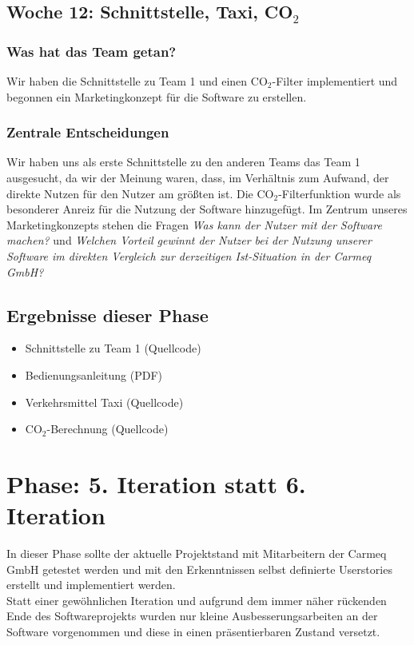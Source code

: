 \documentclass{article}
\begin{document}
\subsection{Woche 12: Schnittstelle, Taxi, CO$_2$}

\subsubsection{Was hat das Team getan?}

Wir haben die Schnittstelle zu Team 1 und einen CO$_2$-Filter implementiert und begonnen ein Marketingkonzept f\"ur die Software zu erstellen.

\subsubsection{Zentrale Entscheidungen}

Wir haben uns als erste Schnittstelle zu den anderen Teams das Team 1 ausgesucht, da wir der Meinung waren, dass, im Verh\"altnis zum Aufwand, der direkte Nutzen f\"ur den Nutzer am gr\"o\ss ten ist. Die CO$_2$-Filterfunktion wurde als besonderer Anreiz f\"ur die Nutzung der Software hinzugef\"ugt. Im Zentrum unseres Marketingkonzepts stehen die Fragen \textit{Was kann der Nutzer mit der Software machen?} und \textit{Welchen Vorteil gewinnt der Nutzer bei der Nutzung unserer Software im direkten Vergleich zur derzeitigen Ist-Situation in der Carmeq GmbH?}

\subsection{Ergebnisse dieser Phase}

\begin{itemize}
\item Schnittstelle zu Team 1 (Quellcode)
\item Bedienungsanleitung (PDF)
\item Verkehrsmittel Taxi (Quellcode)
\item CO$_2$-Berechnung (Quellcode)
\end{itemize}

\section{Phase: 5. Iteration statt 6. Iteration}

In dieser Phase sollte der aktuelle Projektstand mit Mitarbeitern der Carmeq GmbH getestet werden und mit den Erkenntnissen selbst definierte Userstories erstellt und implementiert werden.\\
Statt einer gew\"ohnlichen Iteration und aufgrund dem immer n\"aher r\"uckenden Ende des Softwareprojekts wurden nur kleine Ausbesserungsarbeiten an der Software vorgenommen und diese in einen pr\"asentierbaren Zustand versetzt.
\end{document}

